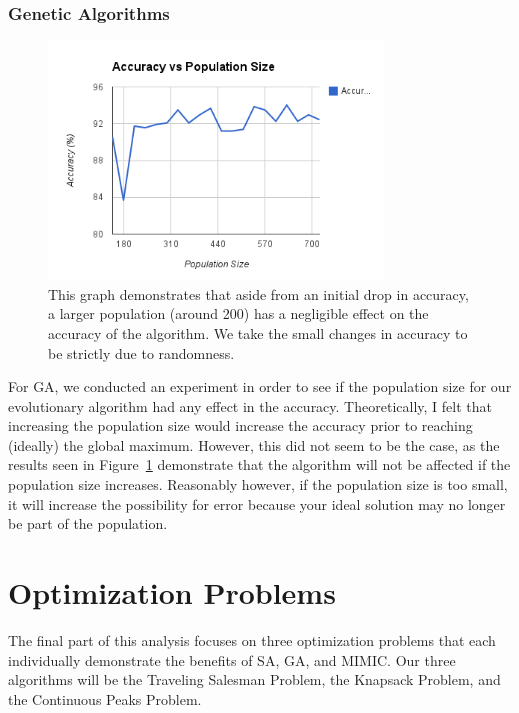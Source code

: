 \documentclass[annual]{acmsiggraph}
\begin{document}
\subsubsection{Genetic Algorithms}
\begin{figure}[ht]
  \centering
  \includegraphics[width=3.5in]{charts/g6_accuracy_vs_pop_for_ga.png}
  \caption{This graph demonstrates that aside from an initial drop in accuracy, a larger population (around 200) has a 
  negligible effect on the accuracy of the algorithm. We take the small changes in accuracy to be strictly due to randomness.}
  \label{fig:g6}
\end{figure}
For GA, we conducted an experiment in order to see if the population size for our evolutionary algorithm had any effect in the
accuracy. Theoretically, I felt that increasing the population size would increase the accuracy prior to reaching (ideally) the
global maximum. However, this did not seem to be the case, as the results seen in Figure~\ref{fig:g6} demonstrate that the
algorithm will not be affected if the population size increases. Reasonably however, if the population size is too small,
it will increase the possibility for error because your ideal solution may no longer be part of the population.

\section{Optimization Problems}
The final part of this analysis focuses on three optimization problems that each individually demonstrate the benefits of SA,
GA, and MIMIC. Our three algorithms will be the Traveling Salesman Problem, the Knapsack Problem, and the Continuous Peaks Problem.
\end{document}
